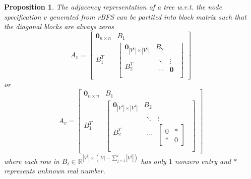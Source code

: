 \documentclass[11pt]{article}
\theoremstyle{definition}
\theoremstyle{remark}
\theoremstyle{plain}
\newtheorem{prop}[defn]{Proposition}
\begin{document}
\begin{prop}
	The adjacency representation of a tree w.r.t. the node specification $v$ generated from rBFS can be partited into block matrix such that the diagonal blocks are always zeros
	\[
		A_v = \begin{bmatrix}
			\mathbf{0}_{n\times n} & B_{1}\\
			B_1^{T} & \begin{bmatrix}
				\mathbf{0}_{|V^1|\times |V^1|} & B_2\\
				B_2^T&\begin{matrix}
					\ddots & \vdots\\
					\cdots & \mathbf{0}\\
				\end{matrix}
			\end{bmatrix}
		\end{bmatrix}
	\]
	or 
	\[
		A_v = \begin{bmatrix}
			\mathbf{0}_{n\times n} & B_{1}\\
			B_1^{T} & \begin{bmatrix}
				\mathbf{0}_{|V^1|\times |V^1|} & B_2\\
				B_2^T&\begin{matrix}
					\ddots & \vdots\\
					\cdots & \begin{bmatrix}
						0 & *\\
						* & 0
					\end{bmatrix}\\
				\end{matrix}
			\end{bmatrix}
		\end{bmatrix}
	\]
	where each row in $B_i \in \mathbb{R}^{|V^i|\times (|V|-\sum_{j=1}^{i}|V^j|)}$ has only $1$ nonzero entry and $*$ represents unknown real number.
\end{prop}
\end{document}
